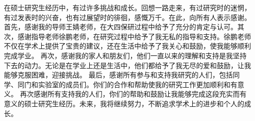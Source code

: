 
\begin{ack}

在硕士研究生经历中，有过许多挑战和成长。回想一路走来，有过研究时的迷惘，有过发表时的兴奋，也有过展望时的徘徊，感慨万千。在此，向所有人表示感谢。
首先，感谢我的导师王婧老师，在大四保研过程中给予了充分的肯定与认可。其次，感谢指导老师徐鹏老师，在研究过程中给予了我无私的指导和支持。徐鹏老师不仅在学术上提供了宝贵的建议，还在生活中给予了我关心和鼓励，使我能够顺利完成学业。
再次，感谢我的家人和朋友们，他们一直以来的理解和支持是我坚持下去的动力。无论是在学业上还是生活中，他们都给予了我无尽的爱和鼓励，让我能够克服困难，迎接挑战。
最后，感谢所有参与和支持我研究的人们，包括同学、同门和实验室的成员们。你们的合作和帮助使我的研究工作更加顺利和有意义。
再次感谢所有支持我的人们，你们的帮助和鼓励让我能够完成这段充实而有意义的硕士研究生经历。未来，我将继续努力，不断追求学术上的进步和个人的成长。

\end{ack}
